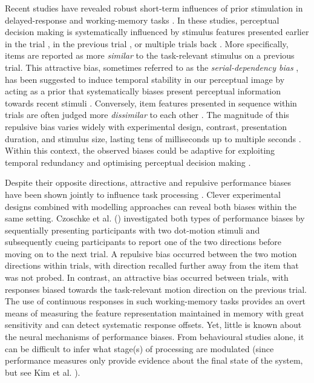 \documentclass{article}
\begin{document}
Recent studies have revealed robust short-term influences of prior stimulation in delayed-response and working-memory tasks \parencite{Bae2017, Czoschke2019, Czoschke2020, Fritsche2017, Cicchini2018, Cicchini2014, Fischer2014}. In these studies, perceptual decision making is systematically influenced by stimulus features presented earlier in the trial \parencite{Czoschke2019, Czoschke2020, Fritsche2017, Fritsche2019, Bae2017}, in the previous trial \parencite{Fritsche2017, Cicchini2017, Cicchini2018, Makovski2008}, or multiple trials back \parencite{Fritsche2020, Fritsche2021, Gekas2019, Suarez-Pinilla2018}. More specifically, items are reported as more \textit{similar} to the task-relevant stimulus on a previous trial. This attractive bias, sometimes referred to as the \textit{serial-dependency bias} \parencite{Fischer2014, Cicchini2014}, has been suggested to induce temporal stability in our perceptual image by acting as a prior that systematically biases present perceptual information towards recent stimuli \parencite{Fritsche2020, Kiyonaga2017}. Conversely, item features presented in sequence within trials are often judged more \textit{dissimilar} to each other \parencite{Born1992, Stormer2014, Fritsche2017}. The magnitude of this repulsive bias varies widely with experimental design, contrast, presentation duration, and stimulus size, lasting tens of milliseconds up to multiple seconds \parencite{Patterson2013, Priebe2002, Fritsche2021, Suarez-Pinilla2018, Fritsche2020}. Within this context, the observed biases could be adaptive for exploiting temporal redundancy and optimising perceptual decision making \parencite{VanBergen2019, Cicchini2018, Kiyonaga2017}.

Despite their opposite directions, attractive and repulsive performance biases have been shown jointly to influence task processing \parencite{Czoschke2019, Fritsche2017, Fritsche2020, Sadil2021}. Clever experimental designs combined with modelling approaches can reveal both biases within the same setting. Czoschke et al. (\citeyear{Czoschke2019}) investigated both types of performance biases by sequentially presenting participants with two dot-motion stimuli and subsequently cueing participants to report one of the two directions before moving on to the next trial. A repulsive bias occurred between the two motion directions within trials, with direction recalled further away from the item that was not probed. In contrast, an attractive bias occurred between trials, with responses biased towards the task-relevant motion direction on the previous trial. The use of continuous responses in such working-memory tasks provides an overt means of measuring the feature representation maintained in memory with great sensitivity and can detect systematic response offsets. Yet, little is known about the neural mechanisms of performance biases. From behavioural studies alone, it can be difficult to infer what stage(s) of processing are modulated (since performance measures only provide evidence about the final state of the system, but see Kim et al. \citeyear{Kim2020}). 
\end{document}
